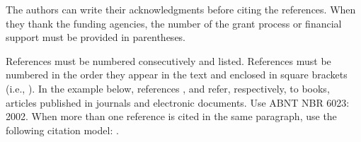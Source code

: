 \documentclass[
	article,			%
	12pt,				%
	oneside,			%
	a4paper,			%
	english,			%
	brazil,				%
	sumario=tradicional
	]{abntex2}
\begin{document}
The authors can write their acknowledgments before citing the references. When they thank the funding agencies, the number of the grant process or financial support must be provided in parentheses.

References must be numbered consecutively and listed. References must be numbered in the order they appear in the text and enclosed in square brackets (i.e., \cite{gomes1998novela}). In the example below, references \cite{gomes1998novela}, \cite{pinto2005biodiesel} and \cite{silva1998pena} refer, respectively, to books, articles published in journals and electronic documents. Use ABNT NBR 6023: 2002. When more than one reference is cited in the same paragraph, use the following citation model: \cite{gomes1998novela, pinto2005biodiesel}.

\postextual

\vspace*{1.5cm}




%
%

\end{document}

